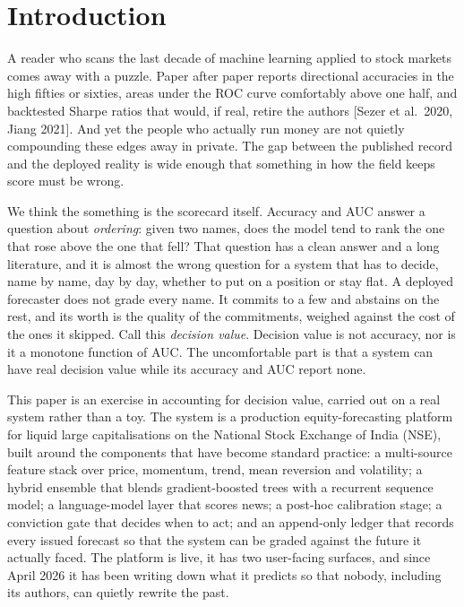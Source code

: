 \documentclass[10pt, a4paper, oneside]{article}
\theoremstyle{definition}
\theoremstyle{plain}
\begin{document}
\section{Introduction}
\label{sec:intro}
A reader who scans the last decade of machine learning applied to stock markets
comes away with a puzzle. Paper after paper reports directional accuracies in the
high fifties or sixties, areas under the ROC curve comfortably above one half, and
backtested Sharpe ratios that would, if real, retire the authors
[Sezer et al.\ 2020, Jiang 2021]. And yet the people who actually run money are not
quietly compounding these edges away in private. The gap between the published
record and the deployed reality is wide enough that something in how the field
keeps score must be wrong.

We think the something is the scorecard itself. Accuracy and AUC answer a question
about \emph{ordering}: given two names, does the model tend to rank the one that
rose above the one that fell? That question has a clean answer and a long
literature, and it is almost the wrong question for a system that has to decide,
name by name, day by day, whether to put on a position or stay flat. A deployed
forecaster does not grade every name. It commits to a few and abstains on the rest,
and its worth is the quality of the commitments, weighed against the cost of the
ones it skipped. Call this \emph{decision value}. Decision value is not accuracy,
nor is it a monotone function of AUC. The uncomfortable part is that a system can
have real decision value while its accuracy and AUC report none.

This paper is an exercise in accounting for decision value, carried out on a real
system rather than a toy. The system is a production equity-forecasting platform
for liquid large capitalisations on the National Stock Exchange of India (NSE),
built around the components that have become standard practice: a multi-source
feature stack over price, momentum, trend, mean reversion and volatility; a hybrid
ensemble that blends gradient-boosted trees with a recurrent sequence model; a
language-model layer that scores news; a post-hoc calibration stage; a conviction
gate that decides when to act; and an append-only ledger that records every issued
forecast so that the system can be graded against the future it actually faced.
The platform is live, it has two user-facing surfaces, and since April 2026 it has
been writing down what it predicts so that nobody, including its authors, can quietly
rewrite the past.
\end{document}
